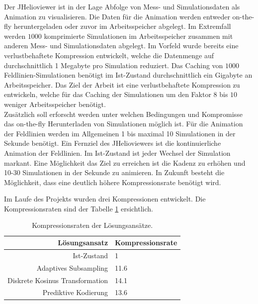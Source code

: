 Der JHelioviewer ist in der Lage Abfolge von Mess- und Simulationsdaten als Animation zu visualisieren. Die Daten für die Animation werden entweder on-the-fly heruntergeladen oder zuvor im Arbeitsspeicher abgelegt. Im Extremfall werden $1000$ komprimierte Simulationen im Arbeitsspeicher zusammen mit anderen Mess- und Simulationsdaten abgelegt. Im Vorfeld wurde bereits eine verlustbehaftete Kompression entwickelt, welche die Datenmenge auf durchschnittlich 1 Megabyte pro Simulation reduziert. Das Caching von $1000$ Feldlinien-Simulationen benötigt im Ist-Zustand durchschnittlich ein Gigabyte an Arbeitsspeicher. Das Ziel der Arbeit ist eine verlustbehaftete Kompression zu entwickeln, welche für das Caching der Simulationen um den Faktor $8$ bis $10$ weniger Arbeitsspeicher benötigt.\\
Zusätzlich soll erforscht werden unter welchen Bedingungen und Kompromisse das on-the-fly Herunterladen von Simulationen möglich ist. Für die Animation der Feldlinien werden im Allgemeinen 1 bis maximal 10 Simulationen in der Sekunde benötigt. Ein Fernziel des JHelioviewers ist die kontinuierliche Animation der Feldlinien. Im Ist-Zustand ist jeder Wechsel der Simulation markant. Eine Möglichkeit das Ziel zu erreichen ist die Kadenz zu erhöhen und 10-30 Simulationen in der Sekunde zu animieren. In Zukunft besteht die Möglichkeit, dass eine deutlich höhere Kompressionsrate benötigt wird.

Im Laufe des Projekts wurden drei Kompressionen entwickelt. Die Kompressionsraten sind der Tabelle \ref{einleitung:tabelle} ersichtlich.
\begin{table}[!htbp]
	\center
	\begin{tabular}{r|l}
		Lösungsansatz & Kompressionsrate \\\hline
		Ist-Zustand & 1\\
		Adaptives Subsampling & 11.6 \\
		Diskrete Kosinus Transformation & 14.1 \\
		Prediktive Kodierung & 13.6\\
	\end{tabular}
	\caption{Kompressionsraten der Lösungsansätze.}
	\label{einleitung:tabelle}
\end{table}
